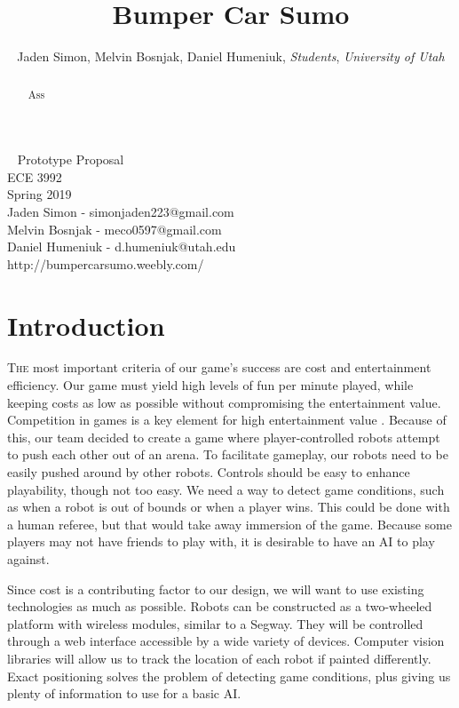 \documentclass[11pt]{ieeeconf}
\title{Bumper Car Sumo}
\author{Jaden Simon, Melvin Bosnjak, Daniel Humeniuk,
 \textit{Students}, \textit{University of Utah}}
\begin{document}
\begin{titlepage}
  \centering
  \
  \vfil
  \Large Prototype Proposal\\
  \Large ECE 3992\\
  \Large Spring 2019\\  
  \Large Jaden Simon - simonjaden223@gmail.com \\
  \Large Melvin Bosnjak - meco0597@gmail.com \\ 
  \Large Daniel Humeniuk - d.humeniuk@utah.edu \\  
  \Large http://bumpercarsumo.weebly.com/\\
  \vfil
\end{titlepage}


\maketitle
\begin{abstract}
Ass
\end{abstract}

\section{Introduction}
\lettrine{T}{he} most important criteria of our game’s success are cost and entertainment efficiency. Our game must yield high levels of fun per minute played, while keeping costs as low as possible without compromising the entertainment value. Competition in games is a key element for high entertainment value \cite{vord:03}.  Because of this, our team decided to create a game where player-controlled robots attempt to push each other out of an arena. To facilitate gameplay, our robots need to be easily pushed around by other robots. Controls should be easy to enhance playability, though not too easy. We need a way to detect game conditions, such as when a robot is out of bounds or when a player wins. This could be done with a human referee, but that would take away immersion of the game. Because some players may not have friends to play with, it is desirable to have an AI to play against. 

Since cost is a contributing factor to our design, we will want to use existing technologies as much as possible. Robots can be constructed as a two-wheeled platform with wireless modules, similar to a Segway. They will be controlled through a web interface accessible by a wide variety of devices. Computer vision libraries will allow us to track the location of each robot if painted differently. Exact positioning solves the problem of detecting game conditions, plus giving us plenty of information to use for a basic AI. 
\end{document}
